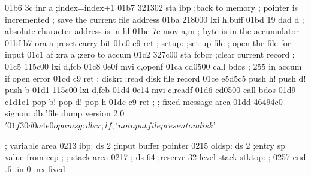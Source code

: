 01b6 3c                              inr  a         ;index=index+1
01b7 321302                          sta  ibp       ;back to memory
                            ;        pointer is incremented
                            ;        save the current file address
01ba 218000                          lxi  h,buff
01bd 19                              dad  d
                            ;        absolute character address is in hl
01be 7e                              mov  a,m
                            ;        byte is in the accumulator
01bf b7                              ora  a         ;reset carry bit
01c0 c9                              ret
                            ;
                            setup:   ;set up file
                            ;        open the file for input
01c1 af                              xra  a         ;zero to accum
01c2 327c00                          sta  fcbcr     ;clear current record
                            ;
01c5 115c00                          lxi  d,fcb
01c8 0e0f                            mvi  c,openf
01ca cd0500                          call bdos
                            ;        255 in accum if open error
01cd c9                              ret
                            ;
                            diskr:   ;read disk file record
01ce e5d5c5                          push h! push d! push b
01d1 115c00                          lxi  d,fcb
01d4 0e14                            mvi  c,readf
01d6 cd0500                          call bdos
01d9 c1d1e1                          pop b! pop d! pop h
01dc c9                              ret                         
                            ;
                            ;        fixed message area
01dd 46494c0                signon:  db   'file dump version 2.0$'
01f3 0d0a4e0                opnmsg:  db   cr,lf,'no  input file present on
                                          disk$'

                            ;        variable area
0213                        ibp:     ds   2         ;input buffer pointer
0215                        oldsp:   ds   2         ;entry sp value from ccp
                            ;
                            ;        stack area
0217                        ;        ds   64        ;reserve 32 level stack
                            stktop:
                            ;
0257                                 end
.fi
.in 0
.nx fived
